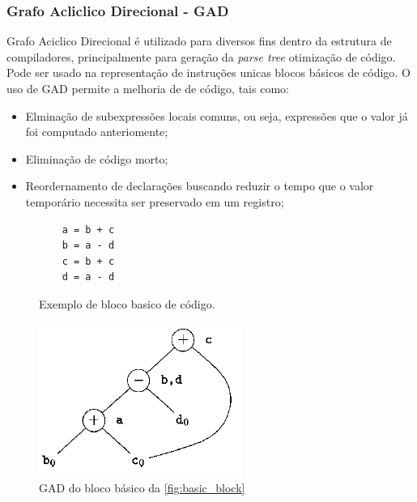 \subsubsection{Grafo Acliclico Direcional - GAD}
\par
Grafo Aciclico Direcional é utilizado para diversos fins dentro da estrutura de compiladores, principalmente para geração da \textit{parse tree} otimização de código. Pode ser usado na representação de instruções unicas blocos básicos de código\cite{aho2007compilers}. O uso de GAD permite a melhoria de de código, tais como:
\begin{itemize}
\item Elminação de subexpressões locais comuns, ou seja, expressões que o valor já foi computado anteriomente;
\item Eliminação de código morto;
\item  Reordernamento de declarações buscando reduzir o tempo que o valor temporário necessita ser preservado em um registro;
\end{itemize}

\par
\begin{figure}[thp]
\caption{\label{fig:basic_block} Exemplo de bloco basico de código.}
	\begin{center}
    \begin{minipage}{0.9\textwidth}
    \begin{lstlisting}
    a = b + c
    b = a - d
    c = b + c
    d = a - d
	\end{lstlisting}
    \end{minipage}
	\end{center}
\end{figure}

\begin{figure}[htb]
	\begin{center}
    \caption{\label{fig:gda}GAD do bloco básico da \autoref{fig:basic_block}}
	\includegraphics[scale=0.70]{Figuras/GDA.png}
	\end{center}
\end{figure}

